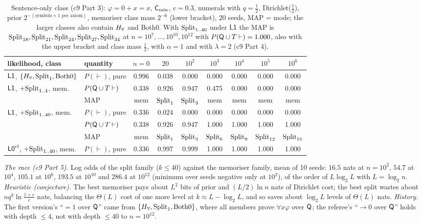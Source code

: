 \begin{table}[ht]
\centering\small
\setlength{\tabcolsep}{4pt}
\begin{tabular}{@{}llccccccc@{}}
\toprule
likelihood, class & quantity & $n=0$ & $20$ & $10^2$ & $10^3$ & $10^4$ & $10^5$ & $10^6$\\
\midrule
$\mathord{\mathsf{L1}}$, $\{H_{\forall},\mathrm{Split}_1,\mathrm{Both0}\}$ & $P(\vdash)$, pure & 0.996 & 0.038 & 0.000 & 0.000 & 0.000 & 0.000 & 0.000\\
$\mathord{\mathsf{L1}}$, $+\mathrm{Split}_{1..4}$, mem. & $P(\mathsf{Q}\cup T\vdash)$ & 0.338 & 0.926 & 0.947 & 0.475 & 0.000 & 0.000 & 0.000\\
 & MAP & mem & $\mathrm{Split}_1$ & $\mathrm{Split}_3$ & mem & mem & mem & mem\\
$\mathord{\mathsf{L1}}$, $+\mathrm{Split}_{1..40}$, mem. & $P(\vdash)$, pure & 0.336 & 0.024 & 0.000 & 0.000 & 0.000 & 0.000 & 0.000\\
 & $P(\mathsf{Q}\cup T\vdash)$ & 0.338 & 0.926 & 0.947 & 1.000 & 1.000 & 1.000 & 1.000\\
 & MAP & mem & $\mathrm{Split}_1$ & $\mathrm{Split}_3$ & $\mathrm{Split}_6$ & $\mathrm{Split}_9$ & $\mathrm{Split}_{12}$ & $\mathrm{Split}_{15}$\\
$\mathord{\mathsf{L0}}^{\mathrm{cl}}$, $+\mathrm{Split}_{1..40}$, mem. & $P(\vdash)$, pure & 0.336 & 0.997 & 0.999 & 1.000 & 1.000 & 1.000 & 1.000\\
\bottomrule
\end{tabular}
\caption{Sentence-only class (c9 Part 3): $\varphi=0+x=x$, $\mathsf{C}_{\min}$, $c=0.3$, numerals with $q=\tfrac12$, Dirichlet($\tfrac12$), prior $2^{-(\text{symbols}+1\text{ per axiom})}$, memoriser class mass $2^{-6}$ (lower bracket), 20 seeds, MAP = mode; the larger classes also contain $H_{\forall}$ and Both0. With $\mathrm{Split}_{1..40}$ under $\mathord{\mathsf{L1}}$ the MAP is $\mathrm{Split}_{18},\mathrm{Split}_{21},\mathrm{Split}_{24},\mathrm{Split}_{27},\mathrm{Split}_{34}$ at $n=10^7,\dots,10^{10},10^{12}$ with $P(\mathsf{Q}\cup T\vdash)=1.000$, also with the upper bracket and class mass $\tfrac12$, with $\alpha=1$ and with $\lambda=2$ (c9 Part 4).}
\label{tab:univ:sentences}
\end{table}

\emph{The race (c9 Part 5).} Log odds of the split family ($k\le40$) against the memoriser family, mean of 10 seeds: $16.5$ nats at $n=10^2$, $54.7$ at $10^4$, $105.1$ at $10^6$, $193.5$ at $10^{10}$ and $286.4$ at $10^{12}$ (minimum over seeds negative only at $10^2$), of the order of $L\log_2L$ with $L=\log_2n$. \emph{Heuristic (conjecture).} The best memoriser pays about $L^2$ bits of prior and $(L/2)\ln n$ nats of Dirichlet cost; the best split wastes about $nq^k\ln\frac{1+c}c$ nats, balancing the $\Theta(L)$ cost of one more level at $k\approx L-\log_2L$, and so saves about $\log_2L$ levels of $\Theta(L)$ nats. \emph{History.} The first version's ``$=1$ over $\mathsf{Q}$'' came from $\{H_{\forall},\mathrm{Split}_1,\mathrm{Both0}\}$, where all members prove $\forall x\varphi$ over $\mathsf{Q}$; the referee's ``$\to0$ over $\mathsf{Q}$'' holds with depth $\le4$, not with depth $\le40$ to $n=10^{12}$.
